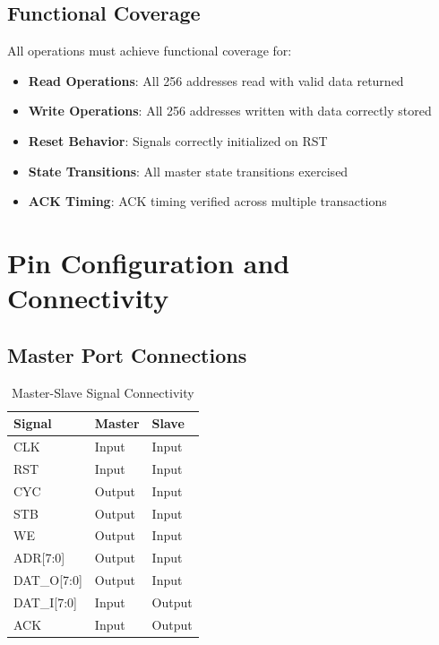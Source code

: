 \documentclass[12pt,a4paper]{article}
\begin{document}
\subsection{Functional Coverage}

All operations must achieve functional coverage for:
\begin{itemize}
    \item \textbf{Read Operations}: All 256 addresses read with valid data returned
    \item \textbf{Write Operations}: All 256 addresses written with data correctly stored
    \item \textbf{Reset Behavior}: Signals correctly initialized on RST
    \item \textbf{State Transitions}: All master state transitions exercised
    \item \textbf{ACK Timing}: ACK timing verified across multiple transactions
\end{itemize}

\section{Pin Configuration and Connectivity}

\subsection{Master Port Connections}

\begin{table}[H]
    \centering
    \begin{tabular}{|l|l|l|}
        \hline
        \textbf{Signal} & \textbf{Master} & \textbf{Slave} \\
        \hline
        CLK & Input & Input \\
        RST & Input & Input \\
        CYC & Output & Input \\
        STB & Output & Input \\
        WE & Output & Input \\
        ADR[7:0] & Output & Input \\
        DAT\_O[7:0] & Output & Input \\
        DAT\_I[7:0] & Input & Output \\
        ACK & Input & Output \\
        \hline
    \end{tabular}
    \caption{Master-Slave Signal Connectivity}
\end{table}
\end{document}
